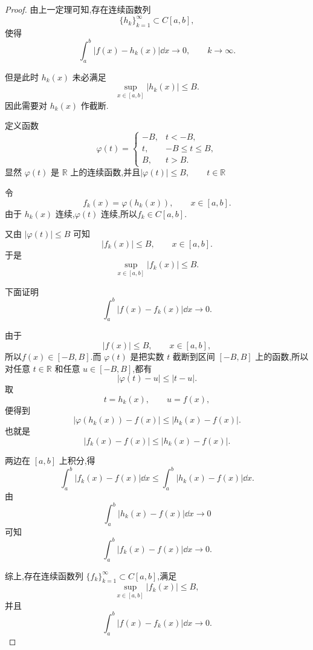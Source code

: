 \begin{proof}
	由上一定理可知,存在连续函数列
	\[
	\{h_k\}_{k=1}^{\infty}\subset C[a,b],
	\]
	使得
	\[
	\int_a^b |f(x)-h_k(x)|\dd x\to0,\qquad k\to\infty.
	\]
	
	但是此时 $h_k(x)$ 未必满足
	\[
	\sup_{x\in[a,b]}|h_k(x)|\leq B.
	\]
	因此需要对 $h_k(x)$ 作截断.
	
	定义函数
	\[
	\varphi(t)=
	\begin{cases}
		-B, & t<-B,\\
		t, & -B\leq t\leq B,\\
		B, & t>B.
	\end{cases}
	\]
	显然 $\varphi(t)$ 是 $\mathbb{R}$ 上的连续函数,并且$|\varphi(t)|\leq B,\qquad t\in\mathbb{R}$
	
	令
	\[
	f_k(x)=\varphi(h_k(x)),\qquad x\in[a,b].
	\]
	由于 $h_k(x)$ 连续,$\varphi(t)$ 连续,所以$f_k\in C[a,b].$
	
	又由 $|\varphi(t)|\leq B$ 可知
	\[
	|f_k(x)|\leq B,\qquad x\in[a,b].
	\]
	于是
	\[
	\sup_{x\in[a,b]}|f_k(x)|\leq B.
	\]
	
	下面证明
	\[
	\int_a^b |f(x)-f_k(x)|\dd x\to0.
	\]
	
	由于
	\[
	|f(x)|\leq B,\qquad x\in[a,b],
	\]
	所以$f(x)\in[-B,B].$而 $\varphi(t)$ 是把实数 $t$ 截断到区间 $[-B,B]$ 上的函数,所以对任意 $t\in\mathbb{R}$ 和任意 $u\in[-B,B]$,都有
	\[
	|\varphi(t)-u|\leq |t-u|.
	\]
	取
	\[
	t=h_k(x),\qquad u=f(x),
	\]
	便得到
	\[
	|\varphi(h_k(x))-f(x)|
	\leq
	|h_k(x)-f(x)|.
	\]
	也就是
	\[
	|f_k(x)-f(x)|
	\leq
	|h_k(x)-f(x)|.
	\]
	
	两边在 $[a,b]$ 上积分,得
	\[
	\int_a^b |f_k(x)-f(x)|\dd x
	\leq
	\int_a^b |h_k(x)-f(x)|\dd x.
	\]
	由
	\[
	\int_a^b |h_k(x)-f(x)|\dd x\to0
	\]
	可知
	\[
	\int_a^b |f_k(x)-f(x)|\dd x\to0.
	\]
	
	综上,存在连续函数列 $\{f_k\}_{k=1}^{\infty}\subset C[a,b]$,满足
	\[
	\sup_{x\in[a,b]}|f_k(x)|\leq B,
	\]
	并且
	\[
	\int_a^b |f(x)-f_k(x)|\dd x\to0.
	\]
\end{proof}